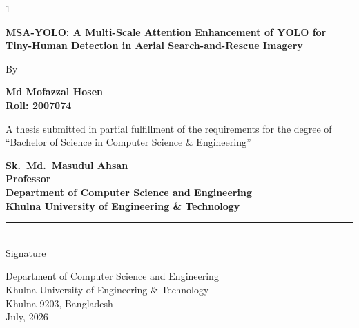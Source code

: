 \begin{spacing}{1}
\setlength{\parskip}{0pt}%
\begin{center}
{\tsizeEighteen\bfseries
MSA-YOLO: A Multi-Scale Attention Enhancement of YOLO for Tiny-Human Detection in Aerial Search-and-Rescue Imagery\par}

\vspace{3\tblanktitle}%

{\tsizeTwelveHalf By\par}

\vspace{2\tblanktitle}%

{\tsizeTwelveHalf\bfseries Md Mofazzal Hosen\\
\normalfont Roll: 2007074\par}

\vspace{\tblanktitle}%

{\tsizeTwelveHalf A thesis submitted in partial fulfillment of the requirements for the degree of\\
``Bachelor of Science in Computer Science \& Engineering''\par}
\end{center}

\vspace{2\tblanktitle}%


\vspace{\tblanktitle}
\noindent\hspace*{0.8in}\begin{minipage}[t]{0.60\textwidth}
{\tsizeTwelveHalf\bfseries Sk.\ Md.\ Masudul Ahsan\\
\normalfont Professor\\
Department of Computer Science and Engineering\\
Khulna University of Engineering \& Technology\par}
\end{minipage}%
\hfill
\begin{minipage}[t]{0.24\textwidth}\centering
  \vspace*{2.4\baselineskip}
  \rule{3.4cm}{0.4pt}\\ {\tsizeTwelveHalf Signature}
\end{minipage}

\vfill
\begin{center}
{\tsizeTwelveHalf
Department of Computer Science and Engineering\\
Khulna University of Engineering \& Technology\\
Khulna 9203, Bangladesh\\
July, 2026\par}
\end{center}
\end{spacing}
\clearpage
